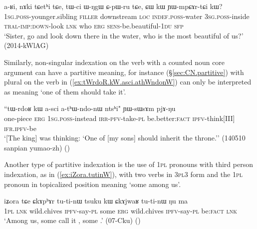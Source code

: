 \begin{exe}
\ex   \label{ex:CW.kW.YWmpCArtCi}
 \gll  a-ʁi, nɤki tɕetʰi tɕe, tɯ-ci ɯ-ŋgɯ ɕ-pɯ-ru tɕe, ɕɯ kɯ ɲɯ-mpɕɤr-tɕi kɯ? \\
 \textsc{1sg}.\textsc{poss}-younger.sibling \textsc{filler} downstream \textsc{loc} \textsc{indef}.\textsc{poss}-water \textsc{3sg}.\textsc{poss}-inside \textsc{tral}-\textsc{imp}:\textsc{down}-look \textsc{lnk} who \textsc{erg} \textsc{sens}-be.beautiful-\textsc{1du} \textsc{sfp} \\
 \glt `Sister, go and look down there in the water, who is the most beautiful of us?' (2014-kWlAG)
\end{exe} 


Similarly, non-singular indexation on the verb with a counted noun core argument can have a partitive meaning, for instance  (§\ref{sec:CN.partitive}) with plural  on the verb in (\ref{ex:tWrdoR.kW.asci.athWndonW}) can only be interpreted as meaning `one of them should take it'.

\begin{exe}
\ex   \label{ex:tWrdoR.kW.asci.athWndonW}
 \gll ``tɯ-rdoʁ kɯ a-sci a-tʰɯ-ndo-nɯ ntsʰi" ɲɯ-sɯsɤm pjɤ-ŋu \\
one-piece \textsc{erg} \textsc{1sg}.\textsc{poss}-instead \textsc{irr}-\textsc{pfv}-take-\textsc{pl} be.better:\textsc{fact} \textsc{ipfv}-think[III] \textsc{ifr}.\textsc{ipfv}-be \\
\glt `[The king] was thinking: `One of [my sons] should inherit the throne.'' (140510 sanpian yumao-zh)
()
\end{exe} 

Another type of partitive indexation is the use of \textsc{1pl} pronouns with third person indexation, as in (\ref{ex:iZora.tutinW}), with two verbs in \textsc{3pl}\fl{}3 form and the \textsc{1pl} pronoun in topicalized position meaning `some among us'.

\begin{exe}
\ex   \label{ex:iZora.tutinW}
 \gll  iʑora tɕe ɕkɤpʰɤr tu-ti-nɯ tsuku kɯ ɕkɤjwaʁ tu-ti-nɯ ŋu ma \\
 \textsc{1pl} \textsc{lnk} wild.chives \textsc{ipfv}-say-\textsc{pl} some \textsc{erg}  wild.chives \textsc{ipfv}-say-\textsc{pl} be:\textsc{fact} \textsc{lnk} \\
\glt `Among us, some call it , some .' (07-Cku)
()
\end{exe} 

